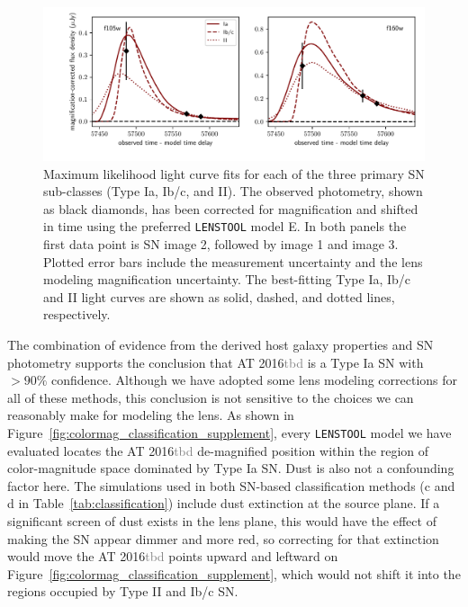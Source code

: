 \documentclass[12pt,dvipsnames]{article}
\def\SNABC{AT 2016{\textcolor{Gray}{tbd}}\xspace}
\def\lenstool{{\tt LENSTOOL}\xspace}
\begin{document}
\begin{figure}
    \centering
    \includegraphics[width=\textwidth]{Paper/Figures/snRequiem_stardust_classify_alltypes.pdf}
    \caption{Maximum likelihood light curve fits for each of the three primary SN sub-classes (Type Ia, Ib/c, and II).  The observed photometry, shown as black diamonds, has been corrected for magnification and shifted in time using the preferred \lenstool model E. In both panels the first data point is SN image 2, followed by image 1 and image 3. Plotted error bars include the measurement uncertainty and the lens modeling magnification uncertainty.  The best-fitting Type Ia, Ib/c and II light curves are shown as solid, dashed, and dotted lines, respectively. 
    \label{fig:classification_lightcurves}
    }
\end{figure}

The combination of evidence from the derived host galaxy properties  and SN photometry supports the conclusion that \SNABC  is  a Type Ia SN with $>90\%$ confidence.  Although we have adopted some lens modeling corrections for all of these methods, this conclusion is not sensitive to the choices we can reasonably make for modeling the lens.  As shown in Figure~\ref{fig:colormag_classification_supplement}, every  \lenstool model we have evaluated locates the \SNABC  de-magnified position within the region of color-magnitude space dominated by Type Ia SN. Dust is also not a confounding factor here. 
The simulations used in both SN-based classification methods (c and d in Table~\ref{tab:classification}) include dust extinction at the source plane.  If a significant screen of dust exists in the lens plane, this would have the effect of making the SN appear dimmer and more red, so correcting for that extinction would move the \SNABC points upward and leftward on Figure~\ref{fig:colormag_classification_supplement}, which would not shift it into the regions occupied by Type II and Ib/c SN. 
\end{document}
